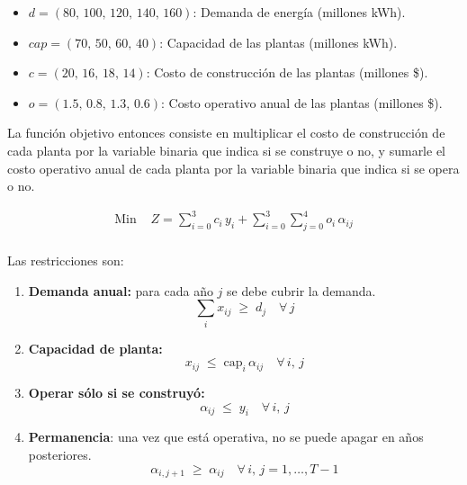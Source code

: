 \documentclass[12pt]{article}
\begin{document}
\begin{itemize}[label=$\rightarrow$]
    \item $d = (80,\,100,\,120,\,140,\,160)$: Demanda de energía (millones kWh).
    \item $cap = (70,\,50,\,60,\,40)$: Capacidad de las plantas (millones kWh).
    \item $c = (20,\,16,\,18,\,14)$: Costo de construcción de las plantas (millones \$).
    \item $o = (1.5,\,0.8,\,1.3,\,0.6)$: Costo operativo anual de las plantas (millones \$).
\end{itemize}

La función objetivo entonces consiste en multiplicar el costo de construcción de cada planta por la variable binaria que indica si se construye o no, y sumarle el costo operativo anual de cada planta por la variable binaria que indica si se opera o no.

\begin{align*}
    \text{Min } & Z = \sum_{i=0}^{3} c_i\,y_i + \sum_{i=0}^{3}\sum_{j=0}^{4} o_i\,\alpha_{ij} \\
\end{align*}

Las restricciones son:

\begin{enumerate}[label=(R\arabic*)]
    \item \textbf{Demanda anual:} para cada año $j$ se debe cubrir la demanda.
          \[\sum_{i} x_{ij} \;\ge\; d_j \quad \forall\, j\]
    \item \textbf{Capacidad de planta:}
          \[x_{ij} \;\le\; \text{cap}_i\,\alpha_{ij} \quad \forall\, i,\,j\]
    \item \textbf{Operar sólo si se construyó:}
          \[\alpha_{ij} \;\le\; y_i \quad \forall\, i,\,j\]
    \item \textbf{Permanencia}: una vez que está operativa, no se puede apagar en años posteriores.
          \[\alpha_{i,j+1} \;\ge\; \alpha_{ij} \quad \forall\, i,\,j=1,\dots,T-1\]
\end{enumerate}
\end{document}
